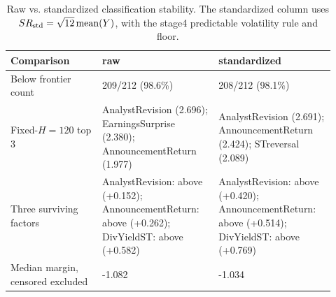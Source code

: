 \begin{table}[htbp]
\centering\small
\caption{Raw vs. standardized classification stability. The standardized column uses $SR_{\rm std}=\sqrt{12}\,\mathrm{mean}(Y)$, with the stage4 predictable volatility rule and floor.}
\label{tab:rev3-m4-raw-std}
\begin{tabular}{p{0.26\linewidth}p{0.33\linewidth}p{0.33\linewidth}}
\toprule
Comparison & raw & standardized \\
\midrule
Below frontier count & 209/212 (98.6\%) & 208/212 (98.1\%) \\
Fixed-$H=120$ top 3 & AnalystRevision (2.696); EarningsSurprise (2.380); AnnouncementReturn (1.977) & AnalystRevision (2.691); AnnouncementReturn (2.424); STreversal (2.089) \\
Three surviving factors & AnalystRevision: above (+0.152); AnnouncementReturn: above (+0.262); DivYieldST: above (+0.582) & AnalystRevision: above (+0.420); AnnouncementReturn: above (+0.514); DivYieldST: above (+0.769) \\
Median margin, censored excluded & -1.082 & -1.034 \\
\bottomrule
\end{tabular}
\end{table}
